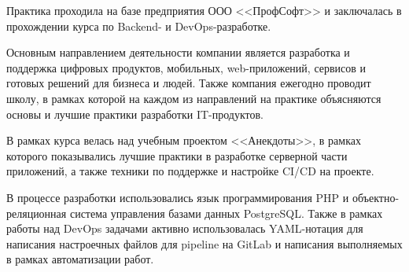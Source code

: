\documentclass[pract]{SCWorks}
\begin{document}

\date{2024}

\maketitle






\sloppy

\intro{}

Практика проходила на базе предприятия ООО <<ПрофСофт>> и заключалась в 
прохождении курса по Backend- и DevOps-разработке.

Основным направлением деятельности компании является разработка и поддержка
цифровых продуктов, мобильных, web-приложений, сервисов и готовых решений 
для бизнеса и людей. Также компания ежегодно проводит школу, в рамках которой
на каждом из направлений на практике объясняются основы и лучшие практики
разработки IT-продуктов. 

В рамках курса велась над учебным проектом <<Анекдоты>>, в рамках которого
показывались лучшие практики в разработке серверной части приложений, а также
техники по поддержке и настройке CI/CD на проекте.

В процессе разработки использовались язык программирования PHP и
объектно-реляционная система управления базами данных PostgreSQL. Также в
рамках работы над DevOps задачами активно использовалась YAML-нотация для
написания настроечных файлов для pipeline на GitLab и написания 
выполняемых в рамках автоматизации работ.
\end{document}
